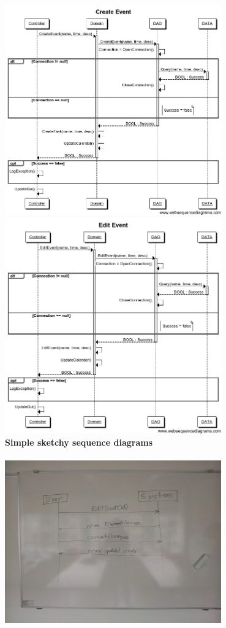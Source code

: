 \documentclass[a4paper,10pt,titlepage]{article}
\begin{document}
\includegraphics[width=0.7\textwidth]{./CreateEventssd}\\[1cm] 
\includegraphics[width=0.7\textwidth]{./EditEventssd}\\[1cm] 
\textbf{Simple sketchy sequence diagrams }
\\ \\
\includegraphics[width=0.7\textwidth]{./ssd2}\\[1cm] 
\end{document}

